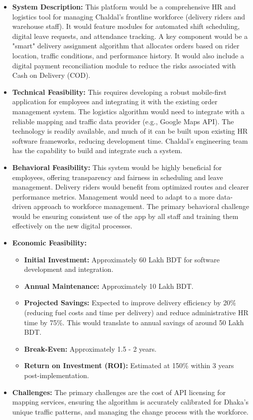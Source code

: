 \documentclass[12pt,a4paper]{article}
\begin{document}
\begin{itemize}
    \item \textbf{System Description:} This platform would be a comprehensive HR and logistics tool for managing Chaldal's frontline workforce (delivery riders and warehouse staff). It would feature modules for automated shift scheduling, digital leave requests, and attendance tracking. A key component would be a "smart" delivery assignment algorithm that allocates orders based on rider location, traffic conditions, and performance history. It would also include a digital payment reconciliation module to reduce the risks associated with Cash on Delivery (COD).
    \item \textbf{Technical Feasibility:} This requires developing a robust mobile-first application for employees and integrating it with the existing order management system. The logistics algorithm would need to integrate with a reliable mapping and traffic data provider (e.g., Google Maps API). The technology is readily available, and much of it can be built upon existing HR software frameworks, reducing development time. Chaldal's engineering team has the capability to build and integrate such a system.
    \item \textbf{Behavioral Feasibility:} This system would be highly beneficial for employees, offering transparency and fairness in scheduling and leave management. Delivery riders would benefit from optimized routes and clearer performance metrics. Management would need to adapt to a more data-driven approach to workforce management. The primary behavioral challenge would be ensuring consistent use of the app by all staff and training them effectively on the new digital processes.
    \item \textbf{Economic Feasibility:} 
    \begin{itemize}
        \item \textbf{Initial Investment:} Approximately 60 Lakh BDT for software development and integration.
        \item \textbf{Annual Maintenance:}  Approximately 10 Lakh BDT.
        \item \textbf{Projected Savings:}  Expected to improve delivery efficiency by 20\% (reducing fuel costs and time per delivery) and reduce administrative HR time by 75\%. This would translate to annual savings of around 50 Lakh BDT.
        \item \textbf{Break-Even:}  Approximately 1.5 - 2 years.
        \item \textbf{Return on Investment (ROI):} Estimated at 150\% within 3 years post-implementation.
    \end{itemize}
    \item \textbf{Challenges:} The primary challenges are the cost of API licensing for mapping services, ensuring the algorithm is accurately calibrated for Dhaka's unique traffic patterns, and managing the change process with the workforce.
\end{itemize}
\end{document}
